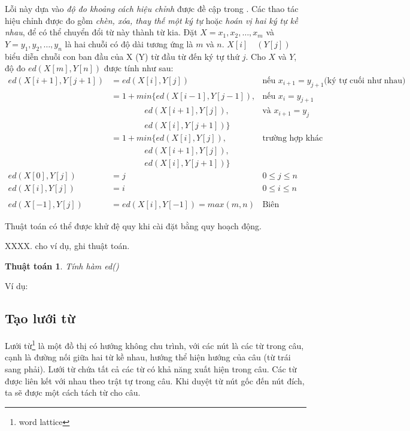 \documentclass[a4paper]{book} %
\newtheorem{algo}{Thuật toán}
\begin{document}
\label{algo:ed}
Lỗi này dựa vào {\em độ đo khoảng cách hiệu chỉnh} được đề cập
trong \cite{Oflazer}. Các thao tác hiệu chỉnh được đo gồm {\em chèn,
xóa, thay thế một ký tự} hoặc {\em hoán vị hai ký tự kề nhau}, để có
thể chuyển đổi từ này thành từ kia. Đặt $X = x_1, x_2, \ldots, x_m$ và
$Y = y_1,y_2,\ldots,y_n$ là hai chuỗi có độ dài tương ứng là $m$ và
$n$. $X[i]\quad(Y[j])$ biểu diễn chuỗi con ban đầu của X (Y) từ đầu từ
đến ký tự thứ $j$. Cho $X$ và $Y$, độ đo $ed(X[m],Y[n])$ được tính như
sau:
\begin{equation}
\begin{array}{rll}
  ed(X[i+1],Y[j+1]) &= ed(X[i],Y[j]) & \text{nếu $x_{i+1}=y_{j+1}$
  (ký tự cuối như nhau)}\\
                    &= 1+min\{ed(X[i-1],Y[j-1]), & \text{nếu $x_i=y_{j+1}$}\\
                    &\qquad\qquad ed(X[i+1],Y[j]), & \text{và $x_{i+1}=y_j$}\\
                    &\qquad\qquad ed(X[i],Y[j+1])\}\\
                    &= 1+min\{ed(X[i],Y[j]),&\text{trường hợp khác}\\
                    &\qquad\qquad ed(X[i+1],Y[j]),\\
                    &\qquad\qquad ed(X[i],Y[j+1])\}\\
  ed(X[0],Y[j])     &=j & 0 \le j \le n\\
  ed(X[i],Y[j])     &=i & 0 \le i \le n\\\\
  ed(X[-1],Y[j])    &=ed(X[i],Y[-1]) = max(m,n)&\text{Biên}
\end{array}
\end{equation}

Thuật toán có thể được khử đệ quy khi cài đặt bằng quy hoạch động.

XXXX. cho ví dụ, ghi thuật toán.
\begin{algo} Tính hàm ed()
  
\end{algo}

Ví dụ:

\subsection{Tạo lưới từ}
\label{sub:lattice}
Lưới từ\footnote{word lattice} là một đồ thị có hướng không chu trình,
với các nút là các từ trong câu, cạnh là đường nối giữa hai từ kề
nhau, hướng thể hiện hướng của câu (từ trái sang phải). Lưới từ
chứa tất cả 
các từ có khả năng xuất hiện trong câu. Các từ được liên kết với nhau
theo trật tự trong câu. Khi duyệt từ nút gốc đến nút đích, ta sẽ được
một cách tách từ cho câu.
\end{document}

